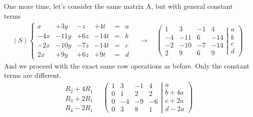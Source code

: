 \documentclass[usenames,dvipsnames,aspectratio=169,10pt]{beamer}
\numberwithin{equation}{section}
\begin{document}
\begin{frame}
One more time, let’s consider the same matrix A, but with general constant terms
\begin{align*}
(S)
\left\{
\begin{matrix}
    x &+  3y &-  z &+  4t &=&  a \\
  -4x &- 11y &+ 6z &- 14t &=&  b \\
  -2x &- 10y &- 7z &- 14t &=&  c \\
   2x &+  9y &+ 6z &+  9t &=&  d
\end{matrix}
\right.
\quad
\longrightarrow
\quad
\left(
	\begin{matrix}
	   1 &   3 & -1 &   4 \\
	  -4 & -11 &  6 & -14 \\
	  -2 & -10 & -7 & -14 \\
	   2 &   9 &  6 &   9
	\end{matrix}
  \left|
	\begin{matrix}
	  a \\
	  b \\
	  c \\
	  d
	\end{matrix}
  \right.
\right)
\end{align*}
And we proceed with the exact same row operations as before. Only the constant
terms are different.
\begin{align*}
\begin{array}{l}
   \\
 R_2 + 4R_1 \\
 R_3 + 2R_1 \\
 R_4 - 2R_1
\end{array}
\quad
\left(
	\begin{matrix}
	   1 &   3 & -1 &   4 \\
	   0 &   1 &  2 &   2 \\
	   0 &  -4 & -9 &  -6 \\
	   0 &   3 &  8 &   1
	\end{matrix}
  \left|
	\begin{matrix}
	  a \\
	  b+4a \\
	  c+2a \\
	  d-2a
	\end{matrix}
  \right.
\right)
\end{align*}
\end{frame}
\end{document}
